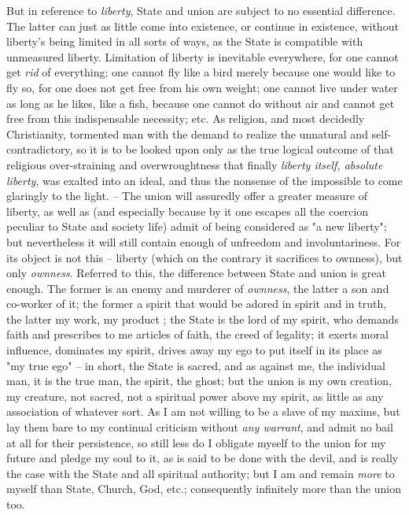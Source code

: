  But in reference to \textit{liberty}, State and union are subject to no 
essential difference. The latter can just as little come into existence, or 
continue in existence, without liberty's being limited in all sorts of ways, 
as the State is compatible with unmeasured liberty. Limitation of liberty is 
inevitable everywhere, for one cannot get \textit{rid} of everything; one 
cannot fly like a bird merely because one would like to fly so, for one does 
not get free from his own weight; one cannot live under water as long as he 
likes, like a fish, because one cannot do without air and cannot get free from 
this indispensable necessity; etc. As religion, and most decidedly 
Christianity, tormented man with the demand to realize the unnatural and self- 
contradictory, so it is to be looked upon only as the true logical outcome of 
that religious over-straining and overwroughtness that finally \textit{liberty 
itself, absolute liberty}, was exalted into an ideal, and thus the nonsense of 
the impossible to come glaringly to the light. -- The union will assuredly 
offer a greater measure of liberty, as well as (and especially because by it 
one escapes all the coercion peculiar to State and society life) admit of 
being considered as "{}a new liberty"{}; but nevertheless it will still 
contain enough of unfreedom and involuntariness. For its object is not this -- 
liberty (which on the contrary it sacrifices to ownness), but only 
\textit{ownness}. Referred to this, the difference between State and union is 
great enough. The former is an enemy and murderer of \textit{ownness}, the 
latter a son and co-worker of it; the former a spirit that would be adored in 
spirit and in truth, the latter my work, my product ; the State is the lord of 
my spirit, who demands faith and prescribes to me articles of faith, the creed 
of legality; it exerts moral influence, dominates my spirit, drives away my 
ego to put itself in its place as "{}my true ego"{} -- in short, the State is 
sacred, and as against me, the individual man, it is the true man, the spirit, 
the ghost; but the union is my own creation, my creature, not sacred, not a 
spiritual power above my spirit, as little as any association of whatever 
sort. As I am not willing to be a slave of my maxims, but lay them bare to my 
continual criticism without \textit{any warrant}, and admit no bail at all for 
their persistence, so still less do I obligate myself to the union for my 
future and pledge my soul to it, as is said to be done with the devil, and is 
really the case with the State and all spiritual authority; but I am and 
remain \textit{more} to myself than State, Church, God, etc.; consequently 
infinitely more than the union too.

